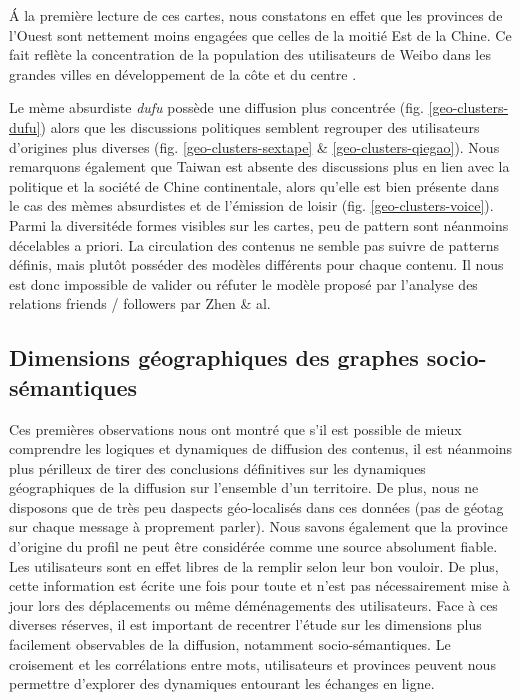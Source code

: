 \'A la première lecture de ces cartes, nous constatons en effet que les provinces de l{\textquoteright}Ouest sont nettement moins engagées que celles de la moitié Est de la Chine. Ce fait reflète la concentration de la population des utilisateurs de Weibo dans les grandes villes en développement de la c\^ote et du centre \citep{Fu2013}. 

Le mème absurdiste \textit{dufu} possède une diffusion plus concentrée (fig. \ref{geo-clusters-dufu}) alors que les discussions politiques semblent regrouper des utilisateurs d{\textquoteright}origines plus diverses (fig. \ref{geo-clusters-sextape} \& \ref{geo-clusters-qiegao}). Nous remarquons également que Taiwan est absente des discussions plus en lien avec la politique et la société de Chine continentale, alors qu{\textquoteright}elle est bien présente dans le cas des mèmes absurdistes et de l{\textquoteright}émission de loisir (fig. \ref{geo-clusters-voice}). Parmi la diversitéde formes visibles sur les cartes, peu de pattern sont néanmoins décelables a priori. La circulation des contenus ne semble pas suivre de patterns définis, mais plutôt posséder des modèles différents pour chaque contenu. Il nous est donc impossible de valider ou réfuter le modèle proposé par l'analyse des relations friends / followers par Zhen \& al\citep{Zhen2013}. 

\subsection{Dimensions géographiques des graphes socio-sémantiques}

Ces premières observations nous ont montré que s{\textquoteright}il est possible de mieux comprendre les logiques et dynamiques de diffusion des contenus, il est néanmoins plus périlleux de tirer des conclusions définitives sur les dynamiques géographiques de la diffusion sur l{\textquoteright}ensemble d{\textquoteright}un territoire. De plus, nous ne disposons que de très peu d{\textquotesingle}aspects {\textquotedbl}géo-localisés{\textquotedbl} dans ces données (pas de géotag sur chaque message \`a proprement parler). Nous savons également que la province d{\textquoteright}origine du profil ne peut être considérée comme une source absolument fiable. Les utilisateurs sont en effet libres de la remplir selon leur bon vouloir. De plus, cette information est écrite une fois pour toute et n{\textquoteright}est pas nécessairement mise \`a jour lors des déplacements ou même déménagements des utilisateurs. Face \`a ces diverses réserves, il est important de recentrer l{\textquoteright}étude sur les dimensions plus facilement observables de la diffusion, notamment socio-sémantiques. Le croisement et les corrélations entre mots, utilisateurs et provinces peuvent nous permettre d'explorer des dynamiques entourant les échanges en ligne.

